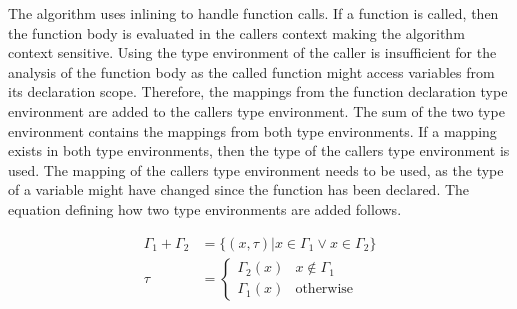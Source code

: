 The algorithm uses inlining to handle function calls. If a function is called, then the function body is evaluated in the callers context making the algorithm context sensitive. Using the type environment of the caller is insufficient for the analysis of the function body as the called function might access variables from its declaration scope. Therefore, the mappings from the function declaration type environment are added to the callers type environment. The sum of the two type environment contains the mappings from both type environments. If a mapping exists in both type environments, then the type of the callers type environment is used. The mapping of the callers type environment needs to be used, as the type of a variable might have changed since the function has been declared. The equation defining how two type environments are added follows.

\begin{align*}
	\Gamma_1 + \Gamma_2 &= \lbrace (x, \tau) | x \in \Gamma_1 \vee x \in \Gamma_2 \rbrace \\
	\tau &= \begin{cases}
		\Gamma_2(x) & x \notin \Gamma_1 \\
		\Gamma_1(x) & \text{otherwise}
	\end{cases}
\end{align*}